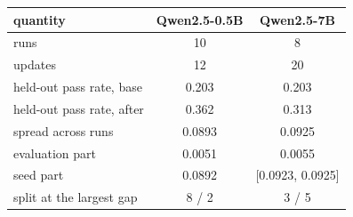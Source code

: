 \setlength{\tabcolsep}{4pt}
\begin{tabular}{@{}lcc@{}}
\toprule
quantity & Qwen2.5-0.5B & Qwen2.5-7B \\
\midrule
runs & 10 & 8 \\
updates & 12 & 20 \\
held-out pass rate, base & 0.203 & 0.203 \\
held-out pass rate, after & 0.362 & 0.313 \\
\midrule
spread across runs & 0.0893 & 0.0925 \\
\quad evaluation part & 0.0051 & 0.0055 \\
\quad seed part & 0.0892 & [0.0923, 0.0925] \\
split at the largest gap & 8 / 2 & 3 / 5 \\
\bottomrule
\end{tabular}